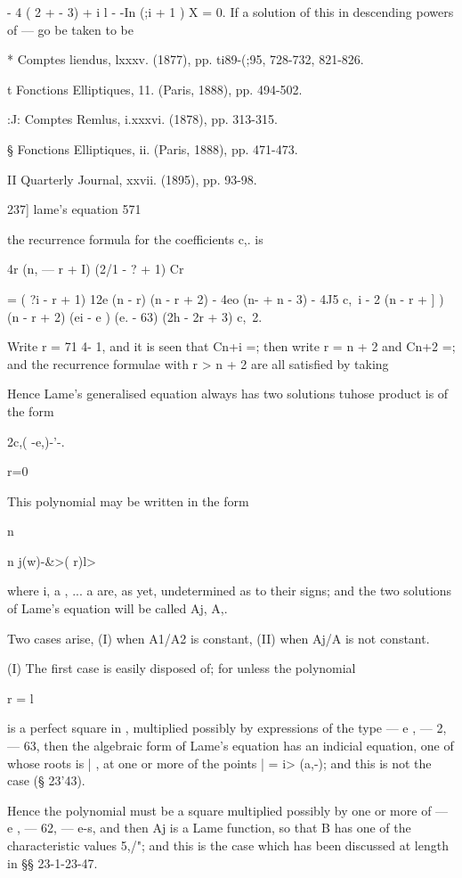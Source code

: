{{{{{{{{- 4 ( 2 + - 3) + i l - -In (;i + 1 ) X = 0. If a solution of this in
descending powers of — go be taken to be

* Comptes liendus, lxxxv. (1877), pp. ti89-(;95, 728-732, 821-826.

t Fonctions Elliptiques, 11. (Paris, 1888), pp. 494-502.

:J: Comptes Remlus, i.xxxvi. (1878), pp. 313-315.

§ Fonctions Elliptiques, ii. (Paris, 1888), pp. 471-473.

II Quarterly Journal, xxvii. (1895), pp. 93-98.

237] lame's equation 571

the recurrence formula for the coefficients c,. is

4r (n, — r + I) (2/1 - ? + 1) Cr

= ( ?i - r + 1) 12e (n - r) (n - r + 2) - 4eo (n- + n - 3) - 4J5 c,\ i
- 2 (n - r + ] ) (n - r + 2) (ei - e ) (e. - 63) (2h - 2r + 3) c,\ 2.

Write r = 71 4- 1, and it is seen that Cn+i =; then write r = n + 2
and Cn+2 =; and the recurrence formulae with r > n + 2 are all
satisfied by taking

Hence Lame's generalised equation always has two solutions tuhose
product is of the form

2c,( -e,)-'-.

r=0

This polynomial may be written in the form

n

n j(w)-\&>( r)l>

where i, a , ... a are, as yet, undetermined as to their signs; and
the two solutions of Lame's equation will be called Aj, A,.

Two cases arise, (I) when A1/A2 is constant, (II) when Aj/A is not
constant.

(I) The first case is easily disposed of; for unless the polynomial

r = l

is a perfect square in , multiplied possibly by expressions of the
type — e , — 2, — 63, then the algebraic form of Lame's equation has
an indicial equation, one of whose roots is | , at one or more of the
points | = i> (a,-); and this is not the case (§ 23'43).

Hence the polynomial must be a square multiplied possibly by one or
more of — e , — 62, — e-s, and then Aj is a Lame function, so that B
has one of the characteristic values 5,/"; and this is the case which
has been discussed at length in §§ 23-1-23-47.

}}}}}}}}
